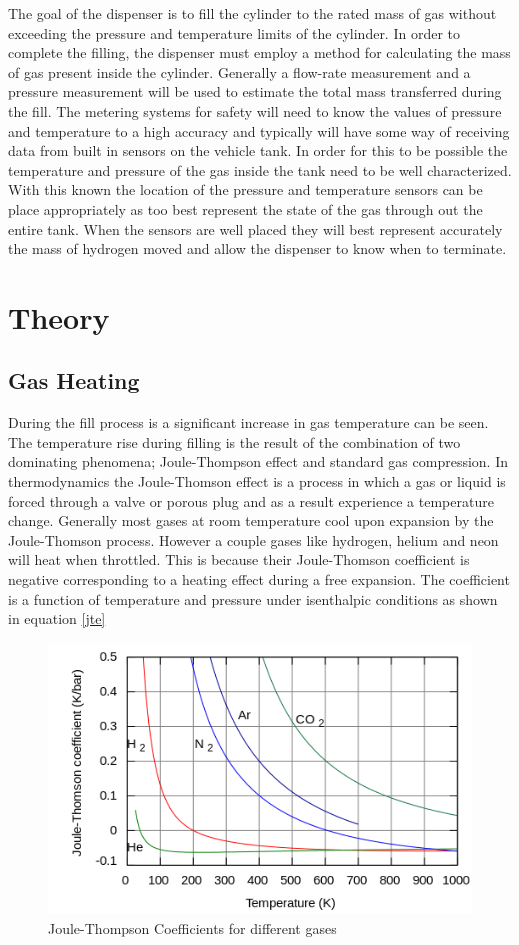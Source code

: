 \documentclass[paper=a4, fontsize=11pt, abstract=on]{scrartcl}
\numberwithin{equation}{section}		%
\numberwithin{figure}{section}			%
\numberwithin{table}{section}				%
\begin{document}
 The goal of the dispenser is to fill the cylinder to the rated mass of gas without exceeding the pressure and temperature limits of the cylinder. In order to complete the filling, the dispenser must employ a method for calculating the mass of gas present inside the cylinder. Generally a flow-rate measurement and a pressure measurement will be used to estimate the total mass transferred during the fill. The metering systems for safety will need to know the values of pressure and temperature to a high accuracy and typically will have some way of receiving data from built in sensors on the vehicle tank. In order for this to be possible the temperature and pressure of the gas inside the tank need to be well characterized. With this known the location of the pressure and temperature sensors can be place appropriately as too best represent the state of the gas through out the entire tank. When the sensors are well placed they will best represent accurately the mass of hydrogen moved and allow the dispenser to know when to terminate.



\section{Theory}

\subsection{Gas Heating}
During the fill process is a significant increase in gas temperature can be seen. The temperature rise during filling is the result of the combination of two dominating phenomena; Joule-Thompson effect and standard gas compression. In thermodynamics the Joule-Thomson effect is a process in which a gas or liquid is forced through a valve or porous plug and as a result experience a temperature change. Generally most gases at room temperature cool upon expansion by the Joule-Thomson process. However a couple gases like hydrogen, helium and neon will heat when throttled. This is because their Joule-Thomson coefficient is negative corresponding to a heating effect during a free expansion. The coefficient is a function of temperature and pressure under isenthalpic conditions as shown in equation \ref{jte}


\begin{figure}[H]
\centering
\includegraphics[width=0.5\linewidth]{jt}
\caption{Joule-Thompson Coefficients for different gases}
\label{jt}
\end{figure}
\end{document}
